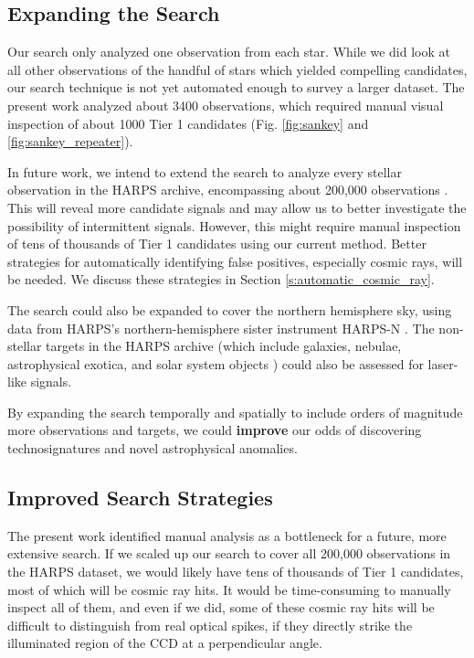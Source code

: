 \documentclass[linenumbers]{aastex701}
\providecommand{\DIFadd}[1]{{\bf #1}} %
\providecommand{\DIFaddbegin}{} %
\providecommand{\DIFaddend}{} %
\begin{document}
\subsection{Expanding the Search}
Our search only analyzed one observation from each star. While we did look at all other observations of the handful of stars which yielded compelling candidates, our search technique is not yet automated enough to survey a larger dataset.  The present work analyzed about 3400 observations, which required manual visual inspection of about 1000 Tier 1 candidates (Fig. \ref{fig:sankey} and \ref{fig:sankey_repeater}).

In future work, we intend to extend the search to analyze every stellar observation in the HARPS archive, encompassing about 200,000 observations \citep{trifonov_2020}.  This will reveal more candidate signals and may allow us to better investigate the possibility of intermittent signals.  However, this might require manual inspection of tens of thousands of Tier 1 candidates using our current method.  Better strategies for automatically identifying false positives, especially cosmic rays, will be needed.  We discuss these strategies in Section \ref{s:automatic_cosmic_ray}.

The search could also be expanded to cover the northern hemisphere sky, using data from HARPS's northern-hemisphere sister instrument HARPS-N \citep{HARPS_N}.  The non-stellar targets in the HARPS archive (which include galaxies, nebulae, astrophysical exotica, and solar system objects \citep{trifonov_2020}) could also be assessed for laser-like signals.

By expanding the search temporally and spatially to include orders of magnitude more observations and targets, we could  \DIFaddbegin \DIFadd{improve }\DIFaddend our odds of discovering technosignatures and novel astrophysical anomalies. 

\subsection{Improved Search Strategies}

The present work identified manual analysis as a bottleneck for a future, more extensive search. If we scaled up our search to cover all 200,000 observations in the HARPS dataset, we would likely have tens of thousands of Tier 1 candidates, most of which will be cosmic ray hits.  It would be time-consuming to manually inspect all of them, and even if we did, some of these cosmic ray hits will be difficult to distinguish from real optical spikes, if they directly strike the illuminated region of the CCD at a perpendicular angle.
\end{document}

